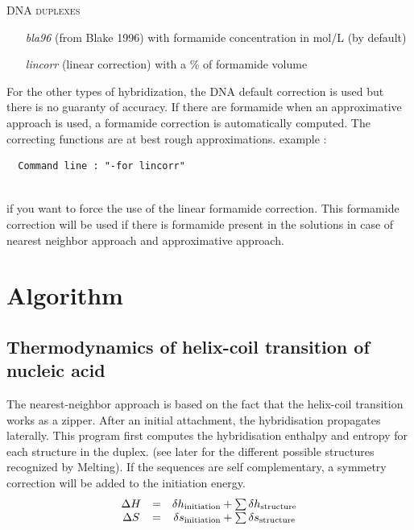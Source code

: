 \documentclass{article}
\begin{document}
\begin{description}
  \textsc{DNA duplexes}
    \begin{itemize}
    \item [\textit{bla96}] (from Blake 1996) with formamide concentration in mol/L  (by default)
    \item [\textit{lincorr}] (linear correction) with a \% of formamide volume		  	 
    \end{itemize}
  For the other types of hybridization, the DNA default correction is used but there is no guaranty of accuracy.
  If there are formamide when an approximative approach is used, a formamide correction is automatically computed.
  The correcting functions are  at  best rough  approximations.
  example :
  
  \begin{verbatim}
  Command line : "-for lincorr" 
  
  \end{verbatim}
  if you want to force the use of the linear formamide correction. This formamide correction will be used if there is formamide 
  present in the solutions in case of nearest neighbor approach and approximative approach. 
\end{description}

 
\section{Algorithm }
  

\subsection{Thermodynamics of helix-coil transition of nucleic acid}  

The nearest-neighbor approach is based on the fact that the helix-coil
transition works as a zipper. After an initial attachment, the hybridisation
propagates laterally. This program first computes the hybridisation enthalpy 
and entropy for each structure in the duplex. (see later for the different possible
structures recognized by Melting). If the sequences are self complementary, a 
symmetry correction will be added to the initiation energy.
\begin{displaymath}
  \begin{array}[t]{ccc}
  \Delta{}H&=&\delta{}h_\mathrm{initiation}+\sum \delta{}h_\mathrm{structure}\\
  \Delta{}S&=&\delta{}s_\mathrm{initiation}+\sum \delta{}s_\mathrm{structure}
  \end{array}
\end{displaymath} 
\end{document}
